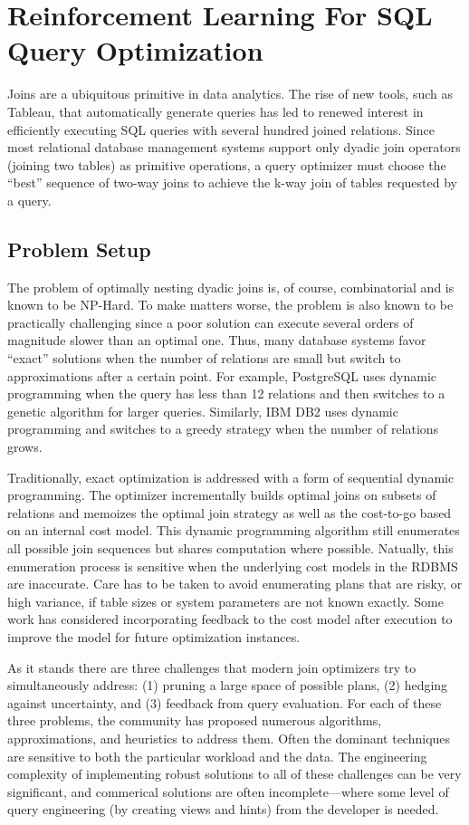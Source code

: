\chapter{Reinforcement Learning For SQL Query Optimization}
Joins are a ubiquitous primitive in data analytics. 
The rise of new tools, such as Tableau, that automatically generate queries has led to renewed interest in efficiently executing SQL queries with several hundred joined relations.
Since most relational database management systems support only dyadic join operators (joining two tables) as primitive operations, a query optimizer must choose the ``best'' sequence of two-way joins to achieve the k-way join of tables requested by a query. 

\section{Problem Setup}
The problem of optimally nesting dyadic joins is, of course, combinatorial and is known to be NP-Hard.
To make matters worse, the problem is also known to be practically challenging since a poor solution can execute several orders of magnitude slower than an optimal one.
Thus, many database systems favor ``exact'' solutions when the number of relations are small but switch to approximations after a certain point.
For example, PostgreSQL uses dynamic programming when the query has less than 12 relations and
then switches to a genetic algorithm for larger queries. 
Similarly, IBM DB2 uses dynamic programming and switches to a greedy strategy when the number of relations grows.

Traditionally, exact optimization is addressed with a form of sequential dynamic programming. 
The optimizer incrementally builds optimal joins on subsets of relations and memoizes the optimal join strategy as well as the cost-to-go based on an internal cost model. 
This dynamic programming algorithm still enumerates all possible join sequences but shares computation where possible.
Natually, this enumeration process is sensitive when the underlying cost models in the RDBMS are inaccurate.
Care has to be taken to avoid enumerating plans that are risky, or high variance, if table sizes or system parameters are not known exactly.
Some work has considered incorporating feedback to the cost model after execution to improve the model for future optimization instances. 

As it stands there are three challenges that modern join optimizers try to simultaneously address: (1) pruning a large space of possible plans, (2) hedging against uncertainty, and (3) feedback from query evaluation. For each of these three problems, the community has proposed numerous algorithms, approximations, and heuristics to address them. Often the dominant techniques are sensitive to both the particular workload and the data. The engineering complexity of implementing robust solutions to all of these challenges can be very significant, and commerical solutions are often incomplete---where some level of query engineering (by creating views and hints) from the developer is needed.

